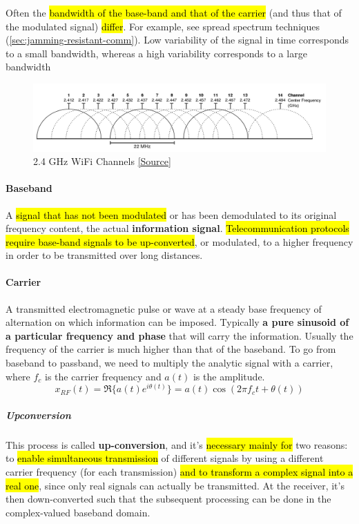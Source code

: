 Often the \hl{bandwidth of the base-band and that of the carrier} (and
thus that of the modulated signal) \hl{differ}. For example, see spread spectrum techniques
(\autoref{sec:jamming-resistant-comm}). Low variability of the signal in time
corresponds to a small bandwidth, whereas a high variability corresponds to a
large bandwidth

\begin{figure}[h]
	\centering
	\includegraphics[scale=0.35]{images/1-wifi-channels.png}
	\caption{2.4 GHz WiFi Channels \href{https://en.wikipedia.org/wiki/List\_of\_WLAN\_channels\#/media/File:2.4\_GHz\_Wi-Fi\_channels\_(802.11b,g_WLAN).svg}{[Source]}}%
	\label{fig:wifi-channels}
\end{figure}

\paragraph{Baseband}
A \hl{signal that has not been modulated} or has been
demodulated to its original frequency content, the actual \textbf{information
	signal}. \hl{Telecommunication protocols require base-band signals to be
	up-converted}, or modulated, to a higher frequency in order to be transmitted over
long distances.

\paragraph{Carrier}
A transmitted electromagnetic pulse or wave at a steady base frequency of
alternation on which information can be imposed. Typically \textbf{a pure
	sinusoid of a particular frequency and phase} that will carry the information.
Usually the frequency of the carrier is much higher than that of the baseband.
To go from baseband to passband, we need to multiply the analytic signal with a
carrier, where $f_c$ is the carrier frequency and $a(t)$ is the amplitude.
\[ x_{RF} (t) = \Re \{a(t)e^{i\theta (t)}\} = a(t) \cos (2 \pi f_c t + \theta(t))\]

\subparagraph{Upconversion}
This process is called \textbf{up-conversion}, and it's \hl{necessary mainly for}
two reasons: to \hl{enable simultaneous transmission} of different signals by using
a different carrier frequency (for each transmission) \hl{and to transform a
	complex signal into a real one}, since only real signals can actually be
transmitted. At the receiver, it's then down-converted such that the subsequent
processing can be done in the complex-valued baseband domain.

